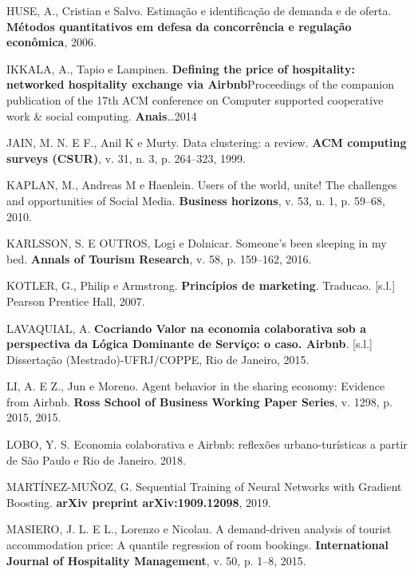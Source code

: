 \documentclass[
	12pt,				%
	a4paper,		%
	oneside,    %
	chapter=TITLE,		   %
	section=TITLE,		   %
	subsection=TITLE,	   %
	subsubsection=TITLE, %
	english,			%
	french,				%
	spanish,			%
	brazil,				%
]{abntex2}
\begin{document}
\leavevmode\hypertarget{ref-huse2006estimaccao}{}%
HUSE, A., Cristian e Salvo. Estimação e identificação de demanda e de
oferta. \textbf{Métodos quantitativos em defesa da concorrência e
regulação econômica}, 2006.

\leavevmode\hypertarget{ref-ikkala2014defining}{}%
IKKALA, A., Tapio e Lampinen. \textbf{Defining the price of hospitality:
networked hospitality exchange via Airbnb}Proceedings of the companion
publication of the 17th ACM conference on Computer supported cooperative
work \& social computing. \textbf{Anais}\ldots{}2014

\leavevmode\hypertarget{ref-jain1999data}{}%
JAIN, M. N. E F., Anil K e Murty. Data clustering: a review. \textbf{ACM
computing surveys (CSUR)}, v. 31, n. 3, p. 264--323, 1999.

\leavevmode\hypertarget{ref-kaplan2010users}{}%
KAPLAN, M., Andreas M e Haenlein. Users of the world, unite! The
challenges and opportunities of Social Media. \textbf{Business
horizons}, v. 53, n. 1, p. 59--68, 2010.

\leavevmode\hypertarget{ref-karlsson2016someone}{}%
KARLSSON, S. E OUTROS, Logi e Dolnicar. Someone's been sleeping in my
bed. \textbf{Annals of Tourism Research}, v. 58, p. 159--162, 2016.

\leavevmode\hypertarget{ref-kotler2007principios}{}%
KOTLER, G., Philip e Armstrong. \textbf{Princípios de marketing}.
Traducao. {[}s.l.{]} Pearson Prentice Hall, 2007.

\leavevmode\hypertarget{ref-lavaquial2015cocriando}{}%
LAVAQUIAL, A. \textbf{Cocriando Valor na economia colaborativa sob a
perspectiva da Lógica Dominante de Serviço: o caso. Airbnb}. {[}s.l.{]}
Dissertação (Mestrado)-UFRJ/COPPE, Rio de Janeiro, 2015.

\leavevmode\hypertarget{ref-li2015agent}{}%
LI, A. E Z., Jun e Moreno. Agent behavior in the sharing economy:
Evidence from Airbnb. \textbf{Ross School of Business Working Paper
Series}, v. 1298, p. 2015, 2015.

\leavevmode\hypertarget{ref-loboeconomia}{}%
LOBO, Y. S. Economia colaborativa e Airbnb: reflexões urbano-turísticas
a partir de São Paulo e Rio de Janeiro. 2018.

\leavevmode\hypertarget{ref-martinez2019sequential}{}%
MARTÍNEZ-MUÑOZ, G. Sequential Training of Neural Networks with Gradient
Boosting. \textbf{arXiv preprint arXiv:1909.12098}, 2019.

\leavevmode\hypertarget{ref-masiero2015demand}{}%
MASIERO, J. L. E L., Lorenzo e Nicolau. A demand-driven analysis of
tourist accommodation price: A quantile regression of room bookings.
\textbf{International Journal of Hospitality Management}, v. 50, p.
1--8, 2015.
\end{document}
